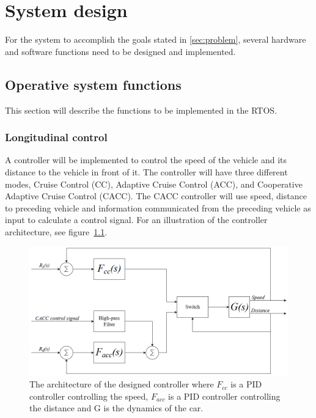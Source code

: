 \chapter{System design}
\label{sec:system_design}
For the system to accomplish the goals stated in \ref{sec:problem}, several hardware and software functions need to be designed and implemented.\\


\section{Operative system functions}
This section will describe the functions to be implemented in the RTOS.

\subsection{Longitudinal control}
A controller will be implemented to control the speed of the vehicle and its distance to the vehicle in front of it. The controller will have three different modes, Cruise Control (CC), Adaptive Cruise Control (ACC), and Cooperative Adaptive Cruise Control (CACC). The CACC controller will use speed, distance to preceding vehicle and information communicated from the preceding vehicle as input to calculate a control signal. For an illustration of the controller architecture, see figure~\ref{fig:cacc}.\\

\begin{figure}[H]
\centering
\includegraphics[width=\textwidth]{./img/design_cacc.png}
\caption{The architecture of the designed controller where $F_{cc}$ is a PID controller controlling the speed, $F_{acc}$ is a PID controller controlling the distance and G is the dynamics of the car.} \label{fig:cacc}
\end{figure}

